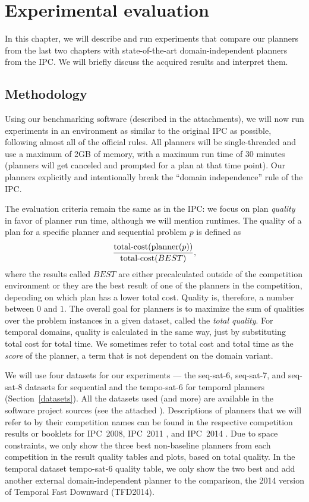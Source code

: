 \chapter{Experimental evaluation}\label{experiments}

In this chapter, we will describe and run experiments
that compare our planners from the last two chapters
with state-of-the-art domain-independent planners from the IPC.
We will briefly discuss the acquired results and interpret them.

\section{Methodology}

Using our benchmarking software (described in the attachments), we will now run experiments in an
environment as similar to the original
IPC as possible, following almost all of the official rules.
All planners will be single-threaded and use a maximum of 2GB of memory, with a maximum run time of 30 minutes (planners will
get canceled and prompted for a plan at that time point).
Our planners explicitly and intentionally break the ``domain independence'' rule of the IPC.

The evaluation criteria remain the same as in the IPC:
we focus on plan \textit{quality} in favor of planner run time,
although we will mention runtimes.
The quality of a plan for a specific planner and sequential problem $p$ is defined as
$$\frac{\textrm{total-cost}(\textrm{planner}(p))}{\textrm{total-cost}(BEST)},$$
where the results called $BEST$
are either precalculated outside of the competition environment or they are the best result of one of the planners in the competition, depending on which plan has a lower total cost.
Quality is, therefore, a number between $0$ and $1$.
The overall goal for planners is to maximize the sum of qualities over the problem instances in a given dataset, called the \textit{total quality}.
For temporal domains, quality is calculated in the same way, just by substituting total cost
for total time. We sometimes refer to total cost and total time as the \textit{score} of the planner, a term that is not dependent on the domain variant.

We will use four datasets for our experiments --- the seq-sat-6, seq-sat-7,
and seq-sat-8 datasets for sequential
and the tempo-sat-6 for temporal planners (Section~\ref{datasets}).
All the datasets used (and more) are available in the
software project sources (see the attached ).
Descriptions of planners that we will refer to by their competition names can be found in the respective competition results or booklets for IPC~2008, IPC~2011 \citep{Garcia-Olaya2011}, and IPC~2014 \citep{Vallati2015}.
Due to space constraints, we only show the three
best non-baseline planners from each competition
in the result quality tables and plots, based on total quality.
In the temporal dataset tempo-sat-6 quality table, we only show the two best
and add another external domain-independent planner
to the comparison, the 2014 version of Temporal Fast Downward (TFD2014).


